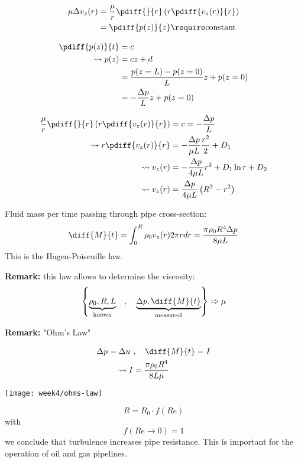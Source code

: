 \begin{align}
\mu\Delta v_z(r) &= \frac{\mu}{r}\pdiff{}{r}\left(r\pdiff{v_z(r)}{r}\right) \\
&= \pdiff{p(z)}{z} \require \mathrm{constant}
\end{align}

\begin{align}
\pdiff{p(z)}{t}&=c \\
\leadsto
p(z) &= cz+d \\
&= \frac{p(z=L)-p(z=0)}{L}z+p(z=0)\\
&= -\frac{\Delta p}{L}z + p(z=0)
\end{align}

\begin{align}
\frac{\mu}{r}\pdiff{}{r}\left(r\pdiff{v_z(r)}{r}\right) &= c = -\frac{\Delta p}{L} \\
\leadsto
r\pdiff{v_z(r)}{r} &= -\frac{\Delta p}{\mu L}\frac{r^2}{2} + D_1 \\
\leadsto
v_z(r) &= -\frac{\Delta p}{4\mu L}r^2 + D_1 \ln r + D_ 2 \\
\leadsto
v_z(r) &= \frac{\Delta p}{4\mu L}\left( R^2 - r^2\right)
\end{align}

Fluid mass per time passing through pipe cross-section:
\begin{equation}
\diff{M}{t} = \int_0^R\rho_0 v_z(r)2\pi r dr = \frac{\pi\rho_0 R^4\Delta p}{8\mu L}
\end{equation}
This is the Hagen-Poiseuille law.
\begin{framed}
\textbf{Remark:} this law allows to determine the viscosity:
\begin{equation}
\left\lbrace \underbrace{\rho_0,R,L}_\mathrm{known} \quad,\quad \underbrace{\Delta p,\diff{M}{t}}_\mathrm{measured} \right\rbrace \Rightarrow \mu
\end{equation}
\end{framed}

\begin{framed}
\textbf{Remark:} "Ohm's Law"

\begin{align}
\Delta p = \Delta u \ &,\quad \diff{M}{t} = I\\
\leadsto
I &= \frac{\pi\rho_0 R^4}{8L\mu}
\end{align}

{\center
\texttt{[image: week4/ohms-law]}\\
}

\begin{equation}
R = R_0\cdot f(Re)
\end{equation}
with
\begin{equation}
f(Re\rightarrow0)=1
\end{equation}
we conclude that turbulence increases pipe resistance. This is important for the operation of oil and gas pipelines.
\end{framed}




